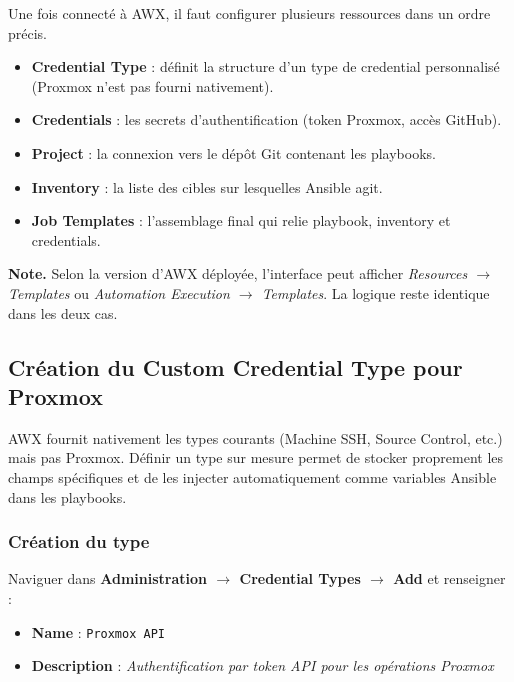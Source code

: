 \documentclass[a4paper]{article}
\newcommand{\cmd}[1]{\texttt{#1}}
\begin{document}
Une fois connecté à AWX, il faut configurer plusieurs ressources dans un ordre précis.

\begin{itemize}
  \item \textbf{Credential Type} : définit la structure d'un type de credential personnalisé (Proxmox n'est pas fourni nativement).
  \item \textbf{Credentials} : les secrets d'authentification (token Proxmox, accès GitHub).
  \item \textbf{Project} : la connexion vers le dépôt Git contenant les playbooks.
  \item \textbf{Inventory} : la liste des cibles sur lesquelles Ansible agit.
  \item \textbf{Job Templates} : l'assemblage final qui relie playbook, inventory et credentials.
\end{itemize}

\begin{infobox}
  \textbf{Note.} Selon la version d'AWX déployée, l'interface peut afficher \textit{Resources \(\to\) Templates} ou \textit{Automation Execution \(\to\) Templates}. La logique reste identique dans les deux cas.
\end{infobox}

\subsection{Création du Custom Credential Type pour Proxmox}

AWX fournit nativement les types courants (Machine SSH, Source Control, etc.) mais pas Proxmox. Définir un type sur mesure permet de stocker proprement les champs spécifiques et de les injecter automatiquement comme variables Ansible dans les playbooks.

\subsubsection*{Création du type}

Naviguer dans \textbf{Administration \(\to\) Credential Types \(\to\) Add} et renseigner :

\begin{itemize}
  \item \textbf{Name} : \cmd{Proxmox API}
  \item \textbf{Description} : \textit{Authentification par token API pour les opérations Proxmox}
\end{itemize}
\end{document}
